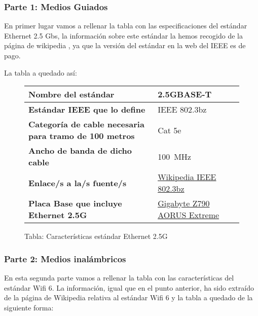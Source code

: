 \subsubsection*{Parte 1: Medios Guiados}
En primer lugar vamos a rellenar la tabla con las especificaciones del estándar Ethernet 2.5 Gbs, la información sobre este estándar la hemos recogido de la página de wikipedia \cite{wiki01}, ya que la versión del estándar en la web del IEEE es de pago.

La tabla a quedado así:

\begin{figure}[ht]

    \vspace{3ex}
    \centering

    \setlength{\tabcolsep}{10pt}
    \renewcommand{\arraystretch}{1.4}

    \begin{tabular}{| l | l |}
        \hline
        \textbf{Nombre del estándar}  & 2.5GBASE-T \\ \hline
        \textbf{Estándar IEEE que lo define} & IEEE 802.3bz   \\ \hline
        \textbf{Categoría de cable necesaria para tramo de 100 metros} & Cat 5e   \\ \hline
        \textbf{Ancho de banda de dicho cable} & 100 MHz    \\ \hline
        \textbf{Enlace/s a la/s fuente/s} & \href{https://es.wikipedia.org/wiki/IEEE_802.3bz_(2.5GBASE-T_y_5GBASE-T)}{Wikipedia IEEE 802.3bz}  \\ \hline
        \textbf{Placa Base que incluye Ethernet 2.5G} & \href{https://www.gigabyte.com/Motherboard/Z790-AORUS-XTREME-rev-10/sp#sp}{Gigabyte Z790 AORUS Extreme}   \\ \hline
    \end{tabular}
    \caption{Tabla: Características estándar Ethernet 2.5G}
\end{figure}

\subsubsection*{Parte 2: Medios inalámbricos}
En esta segunda parte vamos a rellenar la tabla con las características del estándar Wifi 6. La información, igual que en el punto anterior, ha sido extraído de la página de Wikipedia relativa al estándar Wifi 6 \cite{wiki02} y la tabla a quedado de la siguiente forma:

